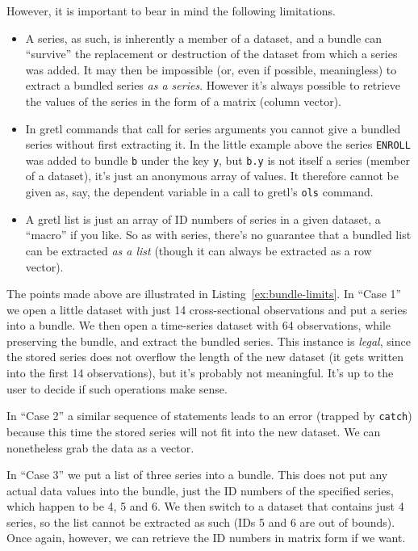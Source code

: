 However, it is important to bear in mind the following limitations.
\begin{itemize}
\item A series, as such, is inherently a member of a dataset, and a
  bundle can ``survive'' the replacement or destruction of the dataset
  from which a series was added. It may then be impossible (or, even
  if possible, meaningless) to extract a bundled series \textit{as a
    series}. However it's always possible to retrieve the values of
  the series in the form of a matrix (column vector).
\item In gretl commands that call for series arguments you cannot give
  a bundled series without first extracting it. In the little example
  above the series \texttt{ENROLL} was added to bundle \texttt{b}
  under the key \texttt{y}, but \texttt{b.y} is not itself a series
  (member of a dataset), it's just an anonymous array of values. It
  therefore cannot be given as, say, the dependent variable in a call
  to gretl's \texttt{ols} command.
\item A gretl list is just an array of ID numbers of series in a given
  dataset, a ``macro'' if you like. So as with series, there's no
  guarantee that a bundled list can be extracted \textit{as a list}
  (though it can always be extracted as a row vector).
\end{itemize}

The points made above are illustrated in Listing~\ref{ex:bundle-limits}.  In
``Case 1'' we open a little dataset with just 14 cross-sectional
observations and put a series into a bundle. We then open a
time-series dataset with 64 observations, while preserving the bundle,
and extract the bundled series. This instance is \textit{legal}, since
the stored series does not overflow the length of the new dataset (it
gets written into the first 14 observations), but it's probably not
meaningful. It's up to the user to decide if such operations make
sense.

In ``Case 2'' a similar sequence of statements leads to an error
(trapped by \texttt{catch}) because this time the stored series will
not fit into the new dataset. We can nonetheless grab the data as a
vector.

In ``Case 3'' we put a list of three series into a bundle. This does
not put any actual data values into the bundle, just the ID numbers of
the specified series, which happen to be 4, 5 and 6. We then switch to
a dataset that contains just 4 series, so the list cannot be extracted
as such (IDs 5 and 6 are out of bounds). Once again, however, we can
retrieve the ID numbers in matrix form if we want.

